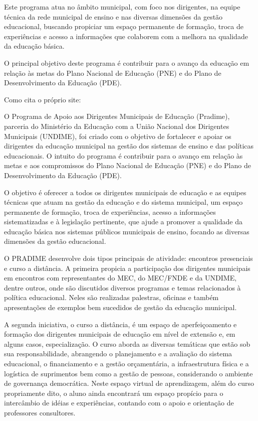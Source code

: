 \documentclass[
	12pt,				%
	openright,			%
	oneside,
	a4paper,			%
	chapter=TITLE,		%
	section=TITLE,		%
	sumario=abnt-6027-2012,
	english,			%
	brazil				%
]{abntex2}
\begin{document}
		Este programa atua no âmbito municipal, com foco nos dirigentes, na equipe técnica da rede municipal de ensino e nas diversas dimensões da gestão educacional, buscando propiciar um espaço permanente de formação, troca de experiências e acesso a informações que colaborem com a melhora na qualidade da educação básica.
		
		O principal objetivo deste programa é contribuir para o avanço da educação em relação às metas do Plano Nacional de Educação (PNE) e do Plano de Desenvolvimento da Educação (PDE).

		Como cita o próprio site:
		
		\begin{citacao}
			O Programa de Apoio aos Dirigentes Municipais de Educação (Pradime), parceria do Ministério da Educação com a União Nacional dos Dirigentes Municipais (UNDIME), foi criado com o objetivo de fortalecer e apoiar os dirigentes da educação municipal na gestão dos sistemas de ensino e das políticas educacionais. O intuito do programa é contribuir para o avanço em relação às metas e aos compromissos do Plano Nacional de Educação (PNE) e do Plano de Desenvolvimento da Educação (PDE).
			
			O objetivo é oferecer a todos os dirigentes municipais de educação e as equipes técnicas que atuam na gestão da educação e do sistema municipal, um espaço permanente de formação, troca de experiências, acesso a informações sistematizadas e à legislação pertinente, que ajude a promover a qualidade da educação básica nos sistemas públicos municipais de ensino, focando as diversas dimensões da gestão educacional.
			
			O PRADIME desenvolve dois tipos principais de atividade: encontros presenciais e curso a distância. A primeira propicia a participação dos dirigentes municipais em encontros com representantes do MEC, do MEC/FNDE e da UNDIME, dentre outros, onde são discutidos diversos programas e temas relacionados à política educacional. Neles são realizadas palestras, oficinas e também apresentações de exemplos bem sucedidos de gestão da educação municipal.
			
			A segunda iniciativa, o curso a distância, é um espaço de aperfeiçoamento e formação dos dirigentes municipais de educação em nível de extensão e, em alguns casos, especialização. O curso aborda as diversas temáticas que estão sob sua responsabilidade, abrangendo o planejamento e a avaliação do sistema educacional, o financiamento e a gestão orçamentária, a infraestrutura física e a logística de suprimentos bem como a gestão de pessoas, considerando o ambiente de governança democrática. Neste espaço virtual de aprendizagem, além do curso propriamente dito, o aluno ainda encontrará um espaço propício para o intercâmbio de idéias e experiências, contando com o apoio e orientação de professores consultores.
		\end{citacao}
\end{document}

